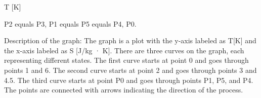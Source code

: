 T [K]

P2 equals P3,
P1 equals P5 equals P4,
P0.

Description of the graph: The graph is a plot with the y-axis labeled as T[K] and the x-axis labeled as S [J/kg · K]. There are three curves on the graph, each representing different states. The first curve starts at point 0 and goes through points 1 and 6. The second curve starts at point 2 and goes through points 3 and 4.5. The third curve starts at point P0 and goes through points P1, P5, and P4. The points are connected with arrows indicating the direction of the process.